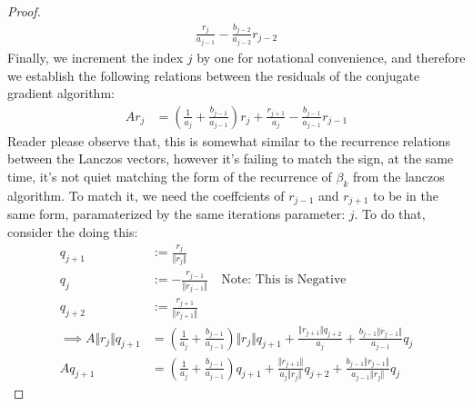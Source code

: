 \documentclass[]{article}
\theoremstyle{definition}
\begin{document}
\begin{proof}
\begin{align}
                    \frac{r_{j}}{a_{j-1}} - 
                    \frac{b_{j - 2}}{a_{j - 2}}r_{j - 2}
                \end{align}
                Finally, we increment the index $j$ by one for notational convenience, and therefore we establish the following relations between the residuals of the conjugate gradient algorithm: 
                \begin{align}
                    Ar_{j} &=
                    \left(
                        \frac{1}{a_{j}} + \frac{b_{j - 1}}{a_{j-  1}}
                    \right)r_{j} + 
                    \frac{r_{j + 1}}{a_{j}} - 
                    \frac{b_{j - 1}}{a_{j - 1}}r_{j - 1}
                \end{align}
                Reader please observe that, this is somewhat similar to the recurrence relations between the Lanczos vectors, however it's failing to match the sign, at the same time, it's not quiet matching the form of the recurrence of $\beta_k$ from the lanczos algorithm. To match it, we need the coeffcients of $r_{j - 1}$ and $r_{j + 1}$ to be in the same form, paramaterized by the same iterations parameter: $j$. To do that, consider the doing this:  
                \begin{align}
                    q_{j + 1} &:= \frac{r_{j}}{\Vert r_j\Vert}
                    \\
                    q_{j} &:= -\frac{r_{j - 1}}{\Vert r_{j - 1}\Vert} \quad 
                    \text{Note: This is Negative}
                    \\
                    q_{j + 2} &:= \frac{r_{j + 1}}{\Vert r_{j + 1}\Vert}
                    \\
                    \implies 
                    A\Vert r_j\Vert q_{j + 1} 
                    &= 
                    \left(
                        \frac{1}{a_j} + \frac{b_{j - 1}}{a_{j - 1}}
                    \right)\Vert r_j\Vert q_{j + 1}
                    + 
                    \frac{\Vert r_{j + 1}\Vert q_{j + 2}}{a_j}
                    +
                    \frac{b_{j - 1}\Vert r_{j - 1}\Vert}{a_{j - 1}}q_{j}
                    \\
                    Aq_{j + 1} &= 
                    \left(
                        \frac{1}{a_j} + \frac{b_{j - 1}}{a_{j - 1}} 
                    \right)
                    q_{j + 1}
                    + 
                    \frac{\Vert r_{j + 1}\Vert}{a_j \Vert r_j\Vert}q_{j + 2} + 
                    \frac{b_{j - 1}\Vert r_{j - 1}\Vert}{a_{j - 1}\Vert r_j\Vert}q_j

\end{align}
\end{proof}
\end{document}

